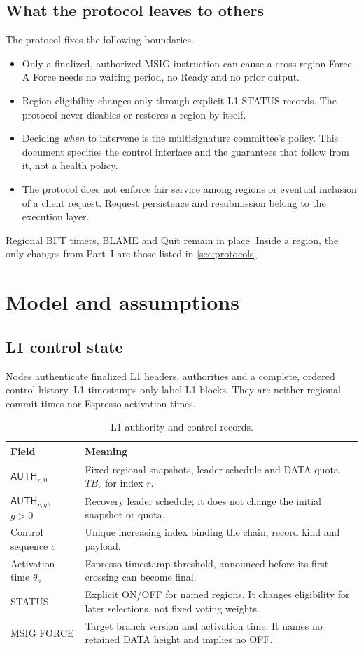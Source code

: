 \documentclass[11pt,a4paper]{article}
\newcommand{\TB}{\mathit{TB}}
\newcommand{\tagg}[1]{\ensuremath{\mathsf{#1}}}
\newcounter{protocol}
\begin{document}
\subsection{What the protocol leaves to others}
\label{sec:scope}
The protocol fixes the following boundaries.
\begin{itemize}
\item Only a finalized, authorized MSIG instruction can cause a
cross-region Force. A Force needs no waiting period, no Ready and no
prior output.
\item Region eligibility changes only through explicit L1 STATUS
records. The protocol never disables or restores a region by itself.
\item Deciding \emph{when} to intervene is the multisignature
committee's policy. This document specifies the control interface and
the guarantees that follow from it, not a health policy.
\item The protocol does not enforce fair service among regions or
eventual inclusion of a client request. Request persistence and
resubmission belong to the execution layer.
\end{itemize}
Regional BFT timers, BLAME and Quit remain in place. Inside a region,
the only changes from Part~I are those listed in \cref{sec:protocols}.

\section{Model and assumptions}
\label{sec:model}
\subsection{L1 control state}
\label{sec:l1}
Nodes authenticate finalized L1 headers, authorities and a complete,
ordered control history. L1 timestamps only label L1 blocks. They are
neither regional commit times nor Espresso activation times.

\begin{table}[htbp]\centering\small
\caption{L1 authority and control records.}\label{tab:l1}
\begin{tabularx}{\linewidth}{@{}p{.27\linewidth}Y@{}}\toprule
Field & Meaning\\\midrule
$\tagg{AUTH}_{r,0}$ & Fixed regional snapshots, leader schedule and
DATA quota $\TB_r$ for index $r$.\\
$\tagg{AUTH}_{r,g}$, $g>0$ & Recovery leader schedule; it does not
change the initial snapshot or quota.\\
Control sequence $c$ & Unique increasing index binding the chain,
record kind and payload.\\
Activation time $\theta_a$ & Espresso timestamp threshold, announced
before its first crossing can become final.\\
STATUS & Explicit ON/OFF for named regions. It changes eligibility for
later selections, not fixed voting weights.\\
MSIG FORCE & Target branch version and activation time. It names no
retained DATA height and implies no OFF.\\\bottomrule
\end{tabularx}
\end{table}
\end{document}
